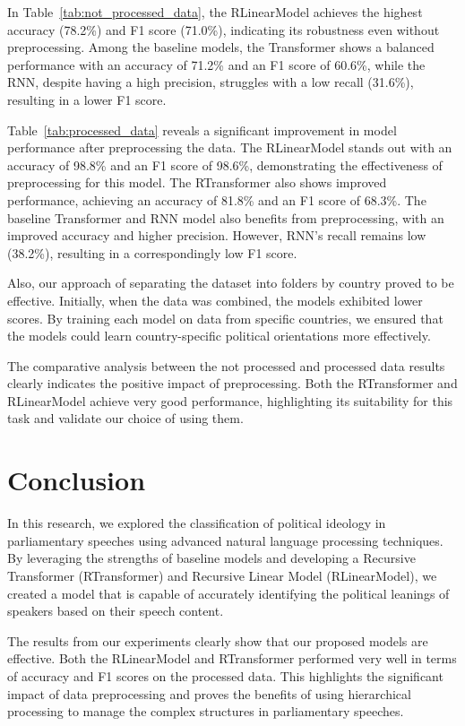 \documentclass[10pt, a4paper]{article}
\begin{document}
In Table~\ref{tab:not_processed_data}, the RLinearModel achieves the highest accuracy (78.2\%) and F1 score (71.0\%), indicating its robustness even without preprocessing. Among the baseline models, the Transformer shows a balanced performance with an accuracy of 71.2\% and an F1 score of 60.6\%, while the RNN, despite having a high precision, struggles with a low recall (31.6\%), resulting in a lower F1 score.

Table~\ref{tab:processed_data} reveals a significant improvement in model performance after preprocessing the data. The RLinearModel stands out with an  accuracy of 98.8\% and an F1 score of 98.6\%, demonstrating the effectiveness of preprocessing for this model. The RTransformer also shows improved performance, achieving an accuracy of 81.8\% and an F1 score of 68.3\%. The baseline Transformer and  RNN model also benefits from preprocessing, with an improved accuracy and higher precision. However, RNN's recall remains low (38.2\%), resulting in a correspondingly low F1 score. 

Also, our approach of separating the dataset into folders by country proved to be effective. Initially, when the data was combined, the models exhibited lower scores. By training each model on data from specific countries, we ensured that the models could learn country-specific political orientations more effectively.

The comparative analysis between the not processed and processed data results clearly indicates the positive impact of preprocessing. Both the RTransformer and RLinearModel achieve very good performance, highlighting its suitability for this task and validate our choice of using them. 

\section{Conclusion}

In this research, we explored the classification of political ideology in parliamentary speeches using advanced natural language processing techniques. By leveraging the strengths of baseline models and developing a Recursive Transformer (RTransformer) and Recursive Linear Model (RLinearModel), we created a model that is capable of accurately identifying the political leanings of speakers based on their speech content.

The results from our experiments clearly show that our proposed models are effective. Both the RLinearModel and RTransformer performed very well in terms of accuracy and F1 scores on the processed data. This highlights the significant impact of data preprocessing and proves the benefits of using hierarchical processing to manage the complex structures in parliamentary speeches.
\end{document}
